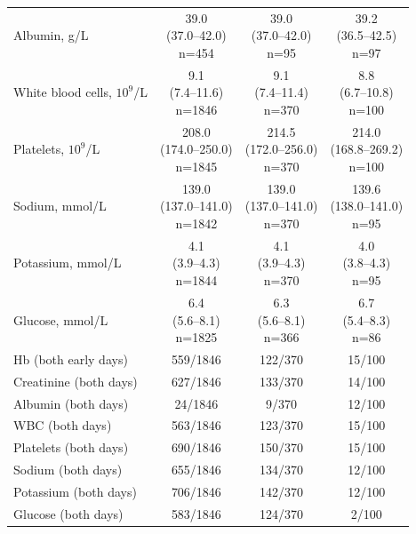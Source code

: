 \documentclass[pdflatex,sn-vancouver-num]{sn-jnl}
\begin{document}
\begin{longtable}{p{3.3cm}ccc}
Albumin, g/L & \shortstack{39.0\\(37.0--42.0)\\n=454} & \shortstack{39.0\\(37.0--42.0)\\n=95} & \shortstack{39.2\\(36.5--42.5)\\n=97}\\
White blood cells, $10^9$/L & \shortstack{9.1\\(7.4--11.6)\\n=1846} & \shortstack{9.1\\(7.4--11.4)\\n=370} & \shortstack{8.8\\(6.7--10.8)\\n=100}\\
Platelets, $10^9$/L & \shortstack{208.0\\(174.0--250.0)\\n=1845} & \shortstack{214.5\\(172.0--256.0)\\n=370} & \shortstack{214.0\\(168.8--269.2)\\n=100}\\
Sodium, mmol/L & \shortstack{139.0\\(137.0--141.0)\\n=1842} & \shortstack{139.0\\(137.0--141.0)\\n=370} & \shortstack{139.6\\(138.0--141.0)\\n=95}\\
Potassium, mmol/L & \shortstack{4.1\\(3.9--4.3)\\n=1844} & \shortstack{4.1\\(3.9--4.3)\\n=370} & \shortstack{4.0\\(3.8--4.3)\\n=95}\\
Glucose, mmol/L & \shortstack{6.4\\(5.6--8.1)\\n=1825} & \shortstack{6.3\\(5.6--8.1)\\n=366} & \shortstack{6.7\\(5.4--8.3)\\n=86}\\
Hb (both early days) & 559/1846 & 122/370 & 15/100\\
Creatinine (both days) & 627/1846 & 133/370 & 14/100\\
Albumin (both days) & 24/1846 & 9/370 & 12/100\\
WBC (both days) & 563/1846 & 123/370 & 15/100\\
Platelets (both days) & 690/1846 & 150/370 & 15/100\\
Sodium (both days) & 655/1846 & 134/370 & 12/100\\
Potassium (both days) & 706/1846 & 142/370 & 12/100\\
Glucose (both days) & 583/1846 & 124/370 & 2/100\\
\end{longtable}
\end{document}
